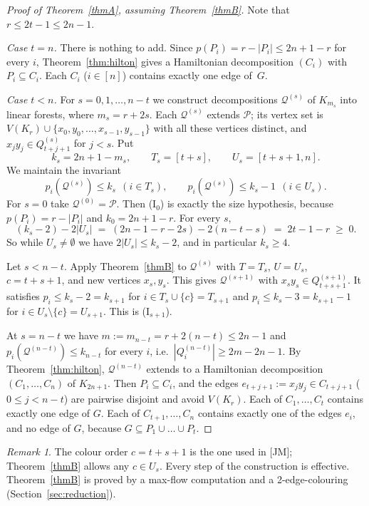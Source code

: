 \documentclass[11pt]{amsart}
\theoremstyle{definition}
\theoremstyle{remark}
\newtheorem{remark}[theorem]{Remark}
\newcommand{\Q}{\mathcal{Q}}
\newcommand{\PP}{\mathcal{P}}
\newcommand{\JM}{\textup{[JM]}}
\begin{document}
\begin{proof}[Proof of Theorem~\ref{thmA}, assuming Theorem~\ref{thmB}]
Note that $r\le 2t-1\le 2n-1$.

\emph{Case $t=n$.} There is nothing to add. Since $p(P_i)=r-|P_i|\le 2n+1-r$ for every $i$,
Theorem~\ref{thm:hilton} gives a Hamiltonian decomposition $(C_i)$ with $P_i\subseteq C_i$.
Each $C_i$ ($i\in[n]$) contains exactly one edge of~$G$.

\emph{Case $t<n$.} For $s=0,1,\dots,n-t$ we construct decompositions $\Q^{(s)}$ of
$K_{m_s}$ into linear forests, where $m_s=r+2s$. Each $\Q^{(s)}$ extends $\PP$; its vertex set is
$V(K_r)\cup\{x_0,y_0,\dots,x_{s-1},y_{s-1}\}$ with all these vertices distinct, and
$x_jy_j\in Q^{(s)}_{t+j+1}$ for $j<s$. Put
\[
k_s=2n+1-m_s,\qquad T_s=[t+s],\qquad U_s=[t+s+1,n].
\]
We maintain the invariant
\[
p_i(\Q^{(s)})\le k_s\ \ (i\in T_s),\qquad p_i(\Q^{(s)})\le k_s-1\ \ (i\in U_s). \tag{I$_s$}
\]
For $s=0$ take $\Q^{(0)}=\PP$. Then (I$_0$) is exactly the size hypothesis, because
$p(P_i)=r-|P_i|$ and $k_0=2n+1-r$. For every $s$,
\[
(k_s-2)-2|U_s| \;=\; (2n-1-r-2s)-2(n-t-s) \;=\; 2t-1-r\;\ge\;0 .
\]
So while $U_s\neq\emptyset$ we have $2|U_s|\le k_s-2$, and in particular $k_s\ge 4$.

Let $s<n-t$. Apply Theorem~\ref{thmB} to $\Q^{(s)}$ with $T=T_s$, $U=U_s$, $c=t+s+1$, and new
vertices $x_s,y_s$. This gives $\Q^{(s+1)}$ with $x_sy_s\in Q^{(s+1)}_{t+s+1}$. It satisfies
$p_i\le k_s-2=k_{s+1}$ for $i\in T_s\cup\{c\}=T_{s+1}$ and $p_i\le k_s-3=k_{s+1}-1$ for
$i\in U_s\setminus\{c\}=U_{s+1}$. This is (I$_{s+1}$).

At $s=n-t$ we have $m:=m_{n-t}=r+2(n-t)\le 2n-1$ and $p_i(\Q^{(n-t)})\le k_{n-t}$ for every
$i$, i.e.\ $|Q^{(n-t)}_i|\ge 2m-2n-1$. By Theorem~\ref{thm:hilton}, $\Q^{(n-t)}$ extends to a
Hamiltonian decomposition $(C_1,\dots,C_n)$ of $K_{2n+1}$. Then $P_i\subseteq C_i$, and the edges
$e_{t+j+1}:=x_jy_j\in C_{t+j+1}$ ($0\le j<n-t$) are pairwise disjoint and avoid $V(K_r)$.
Each of $C_1,\dots,C_t$ contains exactly one edge of $G$. Each of $C_{t+1},\dots,C_n$ contains
exactly one of the edges $e_i$, and no edge of $G$, because $G\subseteq P_1\cup\dots\cup P_t$.
\end{proof}

\begin{remark}
The colour order $c=t+s+1$ is the one used in \JM; Theorem~\ref{thmB} allows any $c\in U_s$.
Every step of the construction is effective. Theorem~\ref{thmB} is proved by a max-flow
computation and a 2-edge-colouring (Section~\ref{sec:reduction}).
\end{remark}
\end{document}
